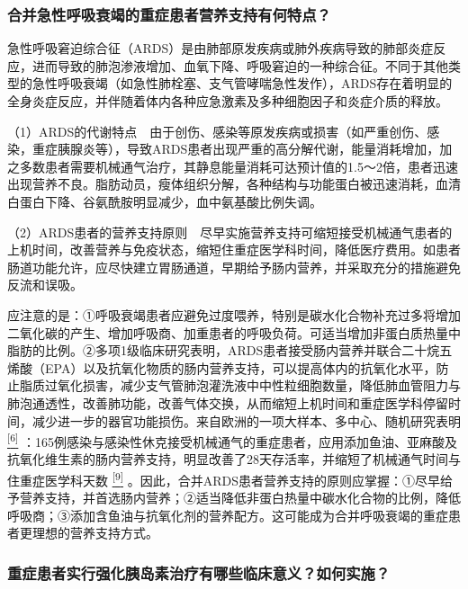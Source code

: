 \subsubsection{合并急性呼吸衰竭的重症患者营养支持有何特点？}

急性呼吸窘迫综合征（ARDS）是由肺部原发疾病或肺外疾病导致的肺部炎症反应，进而导致的肺泡渗液增加、血氧下降、呼吸窘迫的一种综合征。不同于其他类型的急性呼吸衰竭（如急性肺栓塞、支气管哮喘急性发作），ARDS存在着明显的全身炎症反应，并伴随着体内各种应急激素及多种细胞因子和炎症介质的释放。

（1）ARDS的代谢特点　由于创伤、感染等原发疾病或损害（如严重创伤、感染，重症胰腺炎等），导致ARDS患者出现严重的高分解代谢，能量消耗增加，加之多数患者需要机械通气治疗，其静息能量消耗可达预计值的1.5～2倍，患者迅速出现营养不良。脂肪动员，瘦体组织分解，各种结构与功能蛋白被迅速消耗，血清白蛋白下降、谷氨酰胺明显减少，血中氨基酸比例失调。

（2）ARDS患者的营养支持原则　尽早实施营养支持可缩短接受机械通气患者的上机时间，改善营养与免疫状态，缩短住重症医学科时间，降低医疗费用。如患者肠道功能允许，应尽快建立胃肠通道，早期给予肠内营养，并采取充分的措施避免反流和误吸。

应注意的是：①呼吸衰竭患者应避免过度喂养，特别是碳水化合物补充过多将增加二氧化碳的产生、增加呼吸商、加重患者的呼吸负荷。可适当增加非蛋白质热量中脂肪的比例。②多项1级临床研究表明，ARDS患者接受肠内营养并联合二十烷五烯酸（EPA）以及抗氧化物质的肠内营养支持，可以提高体内的抗氧化水平，防止脂质过氧化损害，减少支气管肺泡灌洗液中中性粒细胞数量，降低肺血管阻力与肺泡通透性，改善肺功能，改善气体交换，从而缩短上机时间和重症医学科停留时间，减少进一步的器官功能损伤。来自欧洲的一项大样本、多中心、随机研究表明
\protect\hyperlink{text00028.htmlux5cux23ch6-27}{\textsuperscript{{[}6{]}}}
：165例感染与感染性休克接受机械通气的重症患者，应用添加鱼油、亚麻酸及抗氧化维生素的肠内营养支持，明显改善了28天存活率，并缩短了机械通气时间与住重症医学科天数
\protect\hyperlink{text00028.htmlux5cux23ch9-27}{\textsuperscript{{[}9{]}}}
。因此，合并ARDS患者营养支持的原则应掌握：①尽早给予营养支持，并首选肠内营养；②适当降低非蛋白热量中碳水化合物的比例，降低呼吸商；③添加含鱼油与抗氧化剂的营养配方。这可能成为合并呼吸衰竭的重症患者更理想的营养支持方式。

\subsubsection{重症患者实行强化胰岛素治疗有哪些临床意义？如何实施？}

